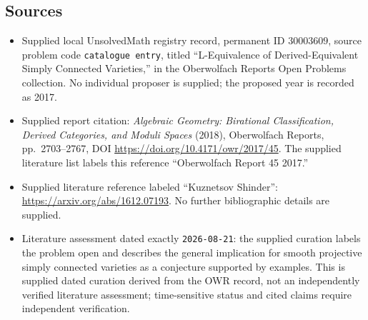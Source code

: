 \documentclass[11pt]{article}
\begin{document}
\subsection{Sources}
\begin{itemize}
\item Supplied local UnsolvedMath registry record, permanent ID \(30003609\), source problem code \texttt{catalogue entry}, titled ``L-Equivalence of Derived-Equivalent Simply Connected Varieties,'' in the Oberwolfach Reports Open Problems collection. No individual proposer is supplied; the proposed year is recorded as 2017.
\item Supplied report citation: \emph{Algebraic Geometry: Birational Classification, Derived Categories, and Moduli Spaces} (2018), Oberwolfach Reports, pp.~2703--2767, DOI \url{https://doi.org/10.4171/owr/2017/45}. The supplied literature list labels this reference ``Oberwolfach Report 45 2017.''
\item Supplied literature reference labeled ``Kuznetsov Shinder'': \url{https://arxiv.org/abs/1612.07193}. No further bibliographic details are supplied.
\item Literature assessment dated exactly \texttt{2026-08-21}: the supplied curation labels the problem open and describes the general implication for smooth projective simply connected varieties as a conjecture supported by examples. This is supplied dated curation derived from the OWR record, not an independently verified literature assessment; time-sensitive status and cited claims require independent verification.
\end{itemize}
\end{document}
